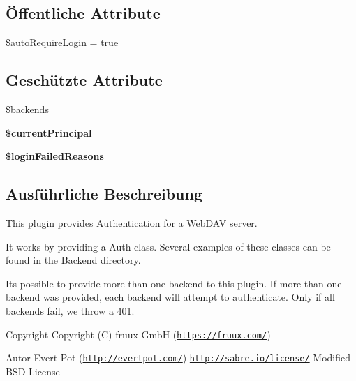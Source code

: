 \subsection*{Öffentliche Attribute}
\begin{DoxyCompactItemize}
\item 
\mbox{\hyperlink{class_sabre_1_1_d_a_v_1_1_auth_1_1_plugin_af88c5506e0997d4d1604b278f6edbf88}{\$auto\+Require\+Login}} = true
\end{DoxyCompactItemize}
\subsection*{Geschützte Attribute}
\begin{DoxyCompactItemize}
\item 
\mbox{\hyperlink{class_sabre_1_1_d_a_v_1_1_auth_1_1_plugin_a00261ff16b310b66aa32761a70e3da90}{\$backends}}
\item 
\mbox{\label{class_sabre_1_1_d_a_v_1_1_auth_1_1_plugin_a93ab1cfb9577ce85eceeec43f4512ce7}} 
{\bfseries \$current\+Principal}
\item 
\mbox{\label{class_sabre_1_1_d_a_v_1_1_auth_1_1_plugin_ae8b4a87d78418e1eb5603c5807c3100f}} 
{\bfseries \$login\+Failed\+Reasons}
\end{DoxyCompactItemize}


\subsection{Ausführliche Beschreibung}
This plugin provides Authentication for a Web\+D\+AV server.

It works by providing a Auth class. Several examples of these classes can be found in the Backend directory.

It\textquotesingle{}s possible to provide more than one backend to this plugin. If more than one backend was provided, each backend will attempt to authenticate. Only if all backends fail, we throw a 401.

\begin{DoxyCopyright}{Copyright}
Copyright (C) fruux GmbH (\href{https://fruux.com/}{\tt https\+://fruux.\+com/}) 
\end{DoxyCopyright}
\begin{DoxyAuthor}{Autor}
Evert Pot (\href{http://evertpot.com/}{\tt http\+://evertpot.\+com/})  \href{http://sabre.io/license/}{\tt http\+://sabre.\+io/license/} Modified B\+SD License 
\end{DoxyAuthor}


